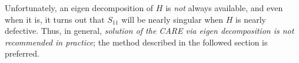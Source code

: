 Unfortunately, an eigen decomposition of $H$ is {\it not} always available, and even when it is, it turns out that $S_{11}$ will be nearly singular
when $H$ is nearly defective.  Thus, in general, {\it solution of the CARE via eigen decomposition is not recommended in practice}; the method
described in the followed section is preferred.


\begin{figure*}[t]

\end{figure*}

